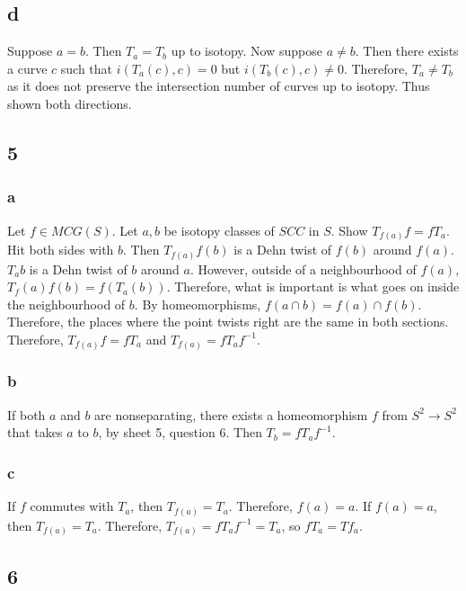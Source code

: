 \documentclass{article}
\theoremstyle{definition}
\numberwithin{theorem}{section}
\numberwithin{equation}{section}
\begin{document}
\subsection{d}
Suppose $a = b$. Then $T_a = T_b$ up to isotopy. Now suppose $a \neq b$. Then there exists a curve $c$ such that $i(T_a(c), c) = 0$ but $i(T_b(c), c) \neq 0$. Therefore, $T_a \neq T_b$ as it does not preserve the intersection number of curves up to isotopy. Thus shown both directions.

\subsection{5}
\subsubsection{a}

Let $f \in MCG(S)$. Let $a, b$ be isotopy classes of $SCC$ in $S$. Show $T_{f(a)} f = f T_a$. Hit both sides with $b$. Then $T_{f(a)} f(b)$ is a Dehn twist of $f(b)$ around $f(a)$. $T_a b$ is a Dehn twist of $b$ around $a$. However, outside of a neighbourhood of $f(a)$, $T_f(a) f(b) = f(T_a(b))$. Therefore, what is important is what goes on inside the neighbourhood of $b$. By homeomorphisms, $f(a \cap b) = f(a) \cap f(b)$. Therefore, the places where the point twists right are the same in both sections. Therefore, $T_{f(a)} f = f T_a$ and $T_{f(a)} = f T_a f^{-1}$. 

\subsubsection{b}

If both $a$ and $b$ are nonseparating, there exists a homeomorphism $f$ from $S^2 \rightarrow S^2$ that takes $a$ to $b$, by sheet 5, question 6. Then $T_b = f T_a f^{-1}$. 

\subsubsection{c}

If $f$ commutes with $T_a$, then $T_{f(a)} = T_{a}$. Therefore, $f(a) = a$. If $f(a) = a$, then $T_{f(a)} = T_{a}$. Therefore, $T_{f(a)} = f T_{a} f^{-1} = T_a$, so $f T_a = T f_a$.

\subsection{6}
\end{document}
